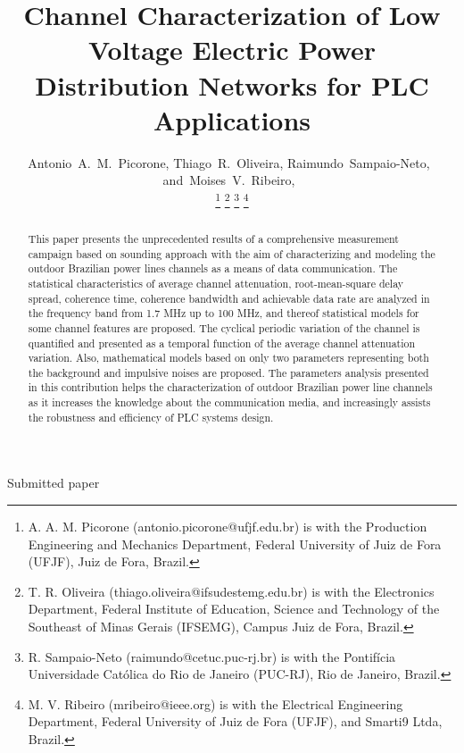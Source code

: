 \documentclass[journal]{IEEEtran}
\begin{document}
	
	\title{Channel Characterization of Low Voltage Electric Power Distribution Networks for PLC Applications}
	
	\author{Antonio~A.~M.~Picorone,
		Thiago~R.~Oliveira,  
		Raimundo~Sampaio-Neto,~     
		and~Moises~V.~Ribeiro,~%
		
		\thanks{A. A. M. Picorone (antonio.picorone@ufjf.edu.br) is with the Production Engineering and Mechanics Department, Federal University of Juiz de Fora (UFJF), Juiz de Fora, Brazil.}%
		\thanks{T. R. Oliveira (thiago.oliveira@ifsudestemg.edu.br) is with the Electronics Department, Federal Institute of Education, Science and Technology of the Southeast of Minas Gerais (IFSEMG), Campus Juiz de Fora, Brazil.}%
		\thanks{R. Sampaio-Neto (raimundo@cetuc.puc-rj.br) is with the Pontif\'icia Universidade Cat\'olica do Rio de Janeiro (PUC-RJ), Rio de Janeiro, Brazil.}%
		\thanks{M. V. Ribeiro (mribeiro@ieee.org) is with the Electrical Engineering Department,
			Federal University of Juiz de Fora (UFJF), and Smarti9 Ltda, Brazil.}%
	}
	
	{Submitted paper}
	
	\maketitle
	
	\begin{abstract}
		This paper presents the unprecedented results of a comprehensive measurement campaign based on sounding approach with the aim of characterizing and modeling the outdoor Brazilian power lines channels as a means of data communication. The statistical characteristics of average channel attenuation, root-mean-square delay spread, coherence time, coherence bandwidth and achievable data rate are analyzed in the frequency band from 1.7 MHz up to 100 MHz, and  thereof  statistical models for some channel features are proposed. 
		The cyclical periodic variation of the channel is quantified and presented as a temporal function of the average channel attenuation variation. 
		Also, mathematical models based on only two parameters representing both the background and impulsive noises are proposed. 
		The parameters analysis presented in this contribution helps the characterization of outdoor Brazilian power line channels as it increases the knowledge about the communication media, and increasingly assists the robustness and efficiency of \ac{PLC} systems design.
	\end{abstract}
	
\end{document}
